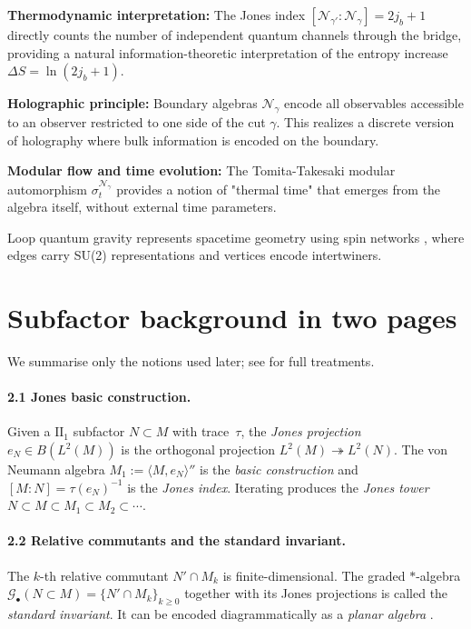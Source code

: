 \documentclass[11pt]{article}
\begin{document}
\textbf{Thermodynamic interpretation:} The Jones index $[\mathcal{N}_{\gamma'}:\mathcal{N}_\gamma] = 2j_b+1$
directly counts the number of independent quantum channels through the bridge,
providing a natural information-theoretic interpretation of the entropy increase
$\Delta S = \ln(2j_b+1)$.

\textbf{Holographic principle:} Boundary algebras $\mathcal{N}_\gamma$ encode all
observables accessible to an observer restricted to one side of the cut $\gamma$.
This realizes a discrete version of holography where bulk information is encoded
on the boundary.

\textbf{Modular flow and time evolution:} The Tomita-Takesaki modular automorphism
$\sigma_t^{\mathcal{N}_\gamma}$ provides a notion of "thermal time" \cite{ConnesRovelli}
that emerges from the algebra itself, without external time parameters.

Loop quantum gravity \cite{Rovelli2004,AshtekarLewandowski2004} represents
spacetime geometry using spin networks \cite{RovelliSmolin1995,Penrose1971},
where edges carry SU(2) representations and vertices encode intertwiners.

\section{Subfactor background in two pages}\label{sec:primer}
We summarise only the notions used later; see \cite{Jones1983, JonesPA,
PopaCBMS} for full treatments.

\paragraph{2.1  Jones basic construction.}
Given a $\mathrm{II}_1$ subfactor $N\subset M$ with trace~$\tau$, the
\emph{Jones projection} $e_N\in B(L^2(M))$ is the orthogonal projection
$L^2(M)\twoheadrightarrow L^2(N)$.  The von Neumann algebra
$M_1:=\langle M,e_N\rangle''$ is the \emph{basic construction} and
$[M:N]=\tau(e_N)^{-1}$ is the \emph{Jones index}.  Iterating produces the
\emph{Jones tower} $N\subset M\subset M_1\subset M_2\subset\cdots$.

\paragraph{2.2  Relative commutants and the standard invariant.}
The $k$-th relative commutant $N'\!\cap M_k$ is finite-dimensional.
The graded $\ast$-algebra
\(
  \mathcal G_{\bullet}(N\subset M)
  =\bigl\{N'\!\cap M_k\}_{k\ge0}
\)
together with its Jones projections is called the \emph{standard
invariant}.  It can be encoded diagrammatically as a \emph{planar algebra}
\cite{JonesPA}.
\end{document}
